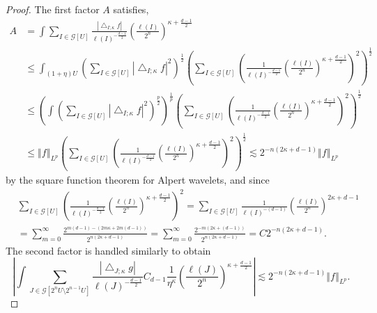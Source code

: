 \documentclass[10pt,a4paper]{amsart}
\begin{document}
\begin{proof}
The first factor $A$ satisfies,%
\begin{align*}
A  & =\int\sum_{I\in\mathcal{G}\left[  U\right]  }\frac{\left\vert
\bigtriangleup_{I;\kappa}f\right\vert }{\ell\left(  I\right)  ^{-\frac{d-1}%
{2}}}\left(  \frac{\ell\left(  I\right)  }{2^{n}}\right)  ^{\kappa+\frac
{d-1}{2}}\\
& \leq\int_{\left(  1+\eta\right)  U}\left(  \sum_{I\in\mathcal{G}\left[
U\right]  }\left\vert \bigtriangleup_{I;\kappa}f\right\vert ^{2}\right)
^{\frac{1}{2}}\left(  \sum_{I\in\mathcal{G}\left[  U\right]  }\left(  \frac
{1}{\ell\left(  I\right)  ^{-\frac{d-1}{2}}}\left(  \frac{\ell\left(
I\right)  }{2^{n}}\right)  ^{\kappa+\frac{d-1}{2}}\right)  ^{2}\right)
^{\frac{1}{2}}\\
& \leq\left(  \int\left(  \sum_{I\in\mathcal{G}\left[  U\right]  }\left\vert
\bigtriangleup_{I;\kappa}f\right\vert ^{2}\right)  ^{\frac{p}{2}}\right)
^{\frac{1}{p}}\left(  \sum_{I\in\mathcal{G}\left[  U\right]  }\left(  \frac
{1}{\ell\left(  I\right)  ^{-\frac{d-1}{2}}}\left(  \frac{\ell\left(
I\right)  }{2^{n}}\right)  ^{\kappa+\frac{d-1}{2}}\right)  ^{2}\right)
^{\frac{1}{2}}\\
& \leq\left\Vert f\right\Vert _{L^{p}}\left(  \sum_{I\in\mathcal{G}\left[
U\right]  }\left(  \frac{1}{\ell\left(  I\right)  ^{-\frac{d-1}{2}}}\left(
\frac{\ell\left(  I\right)  }{2^{n}}\right)  ^{\kappa+\frac{d-1}{2}}\right)
^{2}\right)  ^{\frac{1}{2}}\lesssim2^{-n\left(  2\kappa+d-1\right)
}\left\Vert f\right\Vert _{L^{p}}%
\end{align*}
by the square function theorem for Alpert wavelets, and since%
\begin{align*}
& \sum_{I\in\mathcal{G}\left[  U\right]  }\left(  \frac{1}{\ell\left(
I\right)  ^{-\frac{d-1}{2}}}\left(  \frac{\ell\left(  I\right)  }{2^{n}%
}\right)  ^{\kappa+\frac{d-1}{2}}\right)  ^{2}=\sum_{I\in\mathcal{G}\left[
U\right]  }\frac{1}{\ell\left(  I\right)  ^{-\left(  d-1\right)  }}\left(
\frac{\ell\left(  I\right)  }{2^{n}}\right)  ^{2\kappa+d-1}\\
& =\sum_{m=0}^{\infty}\frac{2^{m\left(  d-1\right)  -\left(  2m\kappa
+2m\left(  d-1\right)  \right)  }}{2^{n\left(  2\kappa+d-1\right)  }}%
=\sum_{m=0}^{\infty}\frac{2^{-m\left(  2\kappa+\left(  d-1\right)  \right)  }%
}{2^{n\left(  2\kappa+d-1\right)  }}=C2^{-n\left(  2\kappa+d-1\right)  }.
\end{align*}
The second factor is handled similarly to obtain%
\[
\left\vert \int\sum_{J\in\mathcal{G}\left[  2^{n}U\setminus2^{n-1}U\right]
}\frac{\left\vert \bigtriangleup_{J;\kappa}g\right\vert }{\ell\left(
J\right)  ^{-\frac{d-1}{2}}}C_{d-1}\frac{1}{\eta^{\kappa}}\left(  \frac
{\ell\left(  J\right)  }{2^{n}}\right)  ^{\kappa+\frac{d-1}{2}}\right\vert
\lesssim2^{-n\left(  2\kappa+d-1\right)  }\left\Vert f\right\Vert _{L^{p}}.
\]



\end{proof}
\end{document}
